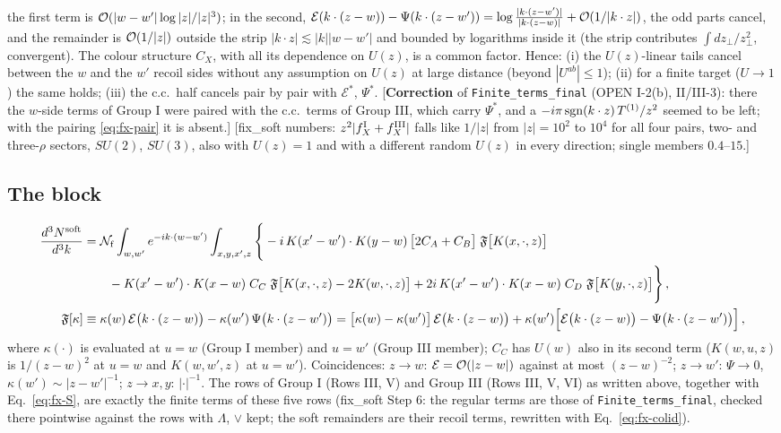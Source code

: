 {the first term is ${\cal O}(|w-w'|\log|z|/|z|^{3})$; in the second, $\mathcal{E}(k\cdot(z-w))-\Psi(k\cdot(z-w'))=\log\frac{|k\cdot(z-w')|}{|k\cdot(z-w)|}+{\cal O}(1/|k\cdot z|)$, the odd parts cancel, and the remainder is ${\cal O}(1/|z|)$ outside the strip $|k\cdot z|\lesssim|k||w-w'|$ and bounded by logarithms inside it (the strip contributes $\int dz_{\perp}/z_{\perp}^{2}$, convergent). The colour structure $C_{X}$, with all its dependence on $U(z)$, is a common factor. Hence: (i) the $U(z)$-linear tails cancel between the $w$ and the $w'$ recoil sides without any assumption on $U(z)$ at large distance (beyond $|U^{ab}|\le1$); (ii) for a finite target ($U\to1$) the same holds; (iii) the c.c.\ half cancels pair by pair with $\mathcal{E}^{*}$, $\Psi^{*}$. [\textbf{Correction} of \texttt{Finite\_terms\_final} (OPEN I-2(b), II/III-3): there the $w$-side terms of Group I were paired with the c.c.\ terms of Group III, which carry $\Psi^{*}$, and a $-i\pi\,{\rm sgn}(k\cdot z)\,T^{(1)}/z^{2}$ seemed to be left; with the pairing \eqref{eq:fx-pair} it is absent.] [fix\_soft numbers: $z^{2}|f^{\rm I}_{X}+f^{\rm III}_{X}|$ falls like $1/|z|$ from $|z|=10^{2}$ to $10^{4}$ for all four pairs, two- and three-$\rho$ sectors, $SU(2)$, $SU(3)$, also with $U(z)=1$ and with a different random $U(z)$ in every direction; single members $0.4$--$15$.]

\subsection*{The block}
\begin{align}
\frac{d^{3}N^{\rm soft}}{d^{3}k}&=\mathcal{N}_{\rm f}\int_{w,w'}e^{-ik\cdot(w-w')}\int_{x,y,x',z}\Bigg\{-i\,K(x'-w')\cdot K(y-w)\,\big[2C_{A}+C_{B}\big]\;\mathfrak{F}\big[K(x,\cdot,z)\big]\notag\\
&\qquad-K(x'-w')\cdot K(x-w)\;C_{C}\;\mathfrak{F}\big[K(x,\cdot,z)-2K(w,\cdot,z)\big]+2i\,K(x'-w')\cdot K(x-w)\;C_{D}\;\mathfrak{F}\big[K(y,\cdot,z)\big]\Bigg\}\,,\label{eq:fx-S}\\
\mathfrak{F}[\kappa]&\equiv\kappa(w)\,\mathcal{E}\big(k\cdot(z-w)\big)-\kappa(w')\,\Psi\big(k\cdot(z-w')\big)=\big[\kappa(w)-\kappa(w')\big]\,\mathcal{E}\big(k\cdot(z-w)\big)+\kappa(w')\Big[\mathcal{E}\big(k\cdot(z-w)\big)-\Psi\big(k\cdot(z-w')\big)\Big]\,,\notag
\end{align}
where $\kappa(\cdot)$ is evaluated at $u=w$ (Group I member) and $u=w'$ (Group III member); $C_{C}$ has $U(w)$ also in its second term ($K(w,u,z)$ is $1/(z-w)^{2}$ at $u=w$ and $K(w,w',z)$ at $u=w'$). Coincidences: $z\to w$: $\mathcal{E}={\cal O}(|z-w|)$ against at most $(z-w)^{-2}$; $z\to w'$: $\Psi\to0$, $\kappa(w')\sim|z-w'|^{-1}$; $z\to x,y$: $|\cdot|^{-1}$. The rows of Group I (Rows III, V) and Group III (Rows III, V, VI) as written above, together with Eq.~\eqref{eq:fx-S}, are exactly the finite terms of these five rows (fix\_soft Step 6: the regular terms are those of \texttt{Finite\_terms\_final}, checked there pointwise against the rows with $\Lambda$, $\vee$ kept; the soft remainders are their recoil terms, rewritten with Eq.~\eqref{eq:fx-colid}).

}
